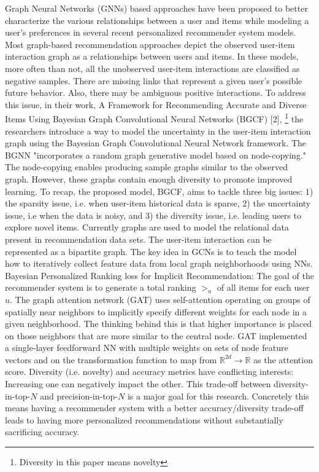 Graph Neural Networks (GNNs) based approaches have been proposed to better characterize the various relationships between a user and items while modeling a user’s preferences in several recent personalized recommender system models. Most graph-based recommendation approaches depict the observed user-item interaction graph as a relationships between users and items. In these models, more often than not, all the unobserved user-item interactions are classified as negative samples. There are missing links that represent a given user’s possible future behavior. Also, there may be ambiguous positive interactions. To address this issue, in their work, A Framework for Recommending Accurate and Diverse Items Using Bayesian Graph Convolutional Neural Networks (BGCF) [2], \footnote {Diversity in this paper means novelty}
the researchers introduce a way to model the uncertainty in the user-item interaction graph using the Bayesian Graph Convolutional Neural Network framework. The BGNN  "incorporates a random graph generative model based on node-copying." The node-copying enables producing sample graphs similar to the observed graph. However, these graphs contain enough diversity to promote improved learning. To recap, the proposed model, BGCF, aims to tackle three big issues: 1) the sparsity issue, i.e. when user-item historical data is sparse, 2) the uncertainty issue, i.e when the data is noisy, and 3) the diversity issue, i.e. leading users to explore novel items. Currently graphs are used to model the relational data present in recommendation data sets. The user-item interaction can be represented as a bipartite graph.  The key idea in GCNs is to teach the model how to iteratively collect feature data from local graph neighborhoods using NNs.  Bayesian Personalized Ranking loss for Implicit Recommendation: The goal of the recommender system is to generate a total ranking $>_u$ of all items for each user $u$. The graph attention network (GAT) uses self-attention operating on groups of spatially near neighbors to implicitly specify different weights for each node in a given neighborhood. The thinking behind this is that higher importance is placed on those neighbors that are more similar to the central node. GAT implemented a single-layer feedforward NN with multiple weights on sets of node feature vectors and on the transformation function to map from $\mathbb{R}^{2d}\longrightarrow\mathbb{R} $  as the attention score. Diversity (i.e. novelty) and accuracy metrics have conflicting interests: Increasing one can negatively impact the other. This trade-off between diversity- in-top-$N$ and precision-in-top-$N$ is a major goal for this research. Concretely this means having a recommender system with a better accuracy/diversity trade-off leads to having more personalized recommendations without substantially sacrificing accuracy.


